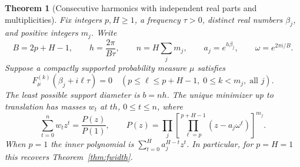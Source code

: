 \documentclass[11pt,letterpaper]{article}
\newtheorem{theorem}{Theorem}[section]
\theoremstyle{remark}\newtheorem{remark}[theorem]{Remark}
\begin{document}
\begin{theorem}[Consecutive harmonics with independent real parts and multiplicities]\label{thm:hblock}
Fix integers $p,H\ge1$, a frequency $\tau>0$, distinct real numbers $\beta_j$, and positive integers $m_j$. Write
\[
 B=2p+H-1,\qquad h=\frac{2\pi}{B\tau},\qquad n=H\sum_jm_j,
 \qquad a_j=e^{h\beta_j},\qquad \omega=e^{2\pi i/B}.
\]
Suppose a compactly supported probability measure $\mu$ satisfies
\begin{equation}\label{eq:hjets}
 F_\mu^{(k)}(\beta_j+i\ell\tau)=0
 \quad(p\le\ell\le p+H-1,\;0\le k<m_j,\;\text{all }j).
\end{equation}
The least possible support diameter is $b=nh$. The unique minimizer up to translation has masses $w_t$ at $th$, $0\le t\le n$, where
\begin{equation}\label{eq:hpoly}
 \sum_{t=0}^n w_t z^t = \frac{P(z)}{P(1)},\qquad
 P(z)=\prod_j\left[\prod_{\ell=p}^{p+H-1}(z-a_j\omega^\ell)\right]^{m_j}.
\end{equation}
When $p=1$ the inner polynomial is $\sum_{t=0}^H a_j^{H-t}z^t$. In particular, for $p=H=1$ this recovers Theorem~\ref{thm:fwidth}.
\end{theorem}
\end{document}
